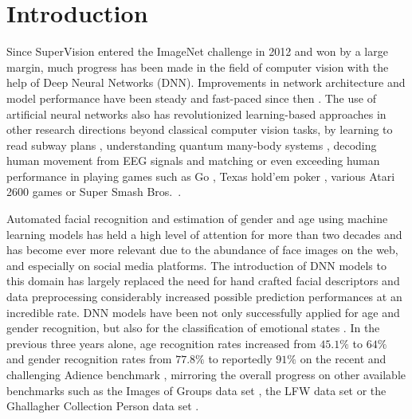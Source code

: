 \documentclass[10pt,twocolumn,letterpaper]{article}
\begin{document}
\section{Introduction}
\label{sec:introduction}

Since SuperVision \cite{krizhevsky2012imagenet} entered the ImageNet \cite{russakovsky2015imagenet} challenge in 2012 and won by a large margin, much progress has been made in the field of computer vision with the help of Deep Neural Networks (DNN). Improvements in network architecture and model performance have been steady and fast-paced since then \cite{zeiler2014visualizing,simonyan2014very,szegedy2015going,szegedy2016inception}. The use of artificial neural networks also has revolutionized learning-based approaches in other research directions beyond classical computer vision tasks, \eg by learning to read subway plans \cite{graves2016hybrid}, understanding quantum many-body systems \cite{schutt2017quantum}, decoding human movement from EEG signals \cite{StuJNM16,schirrmeister2017deep} and matching or even exceeding human performance in playing games such as Go \cite{silver2016mastering}, Texas hold'em poker \cite{moravvcik2017deepstack}, various Atari 2600 games \cite{mnih2015human} or Super Smash Bros.~\cite{firoiu2017beating}.

Automated facial recognition and estimation of gender and age using machine learning models has held a high level of attention for more than two decades \cite{kwon1994age,o1997sex,baluja2007boosting,guo2009study,gao2009face} and has become ever more relevant due to the abundance of face images on the web, and especially on social media platforms.
The introduction of DNN models to this domain has largely replaced the need for hand crafted facial descriptors and data preprocessing considerably increased possible prediction performances at an incredible rate. DNN models have been not only successfully applied for age and gender recognition, but also for the classification of emotional states \cite{ArbGCPR16}.
In the previous three years alone, age recognition rates increased from $45.1\%$ \cite{eidinger2014age} to $64\%$ \cite{rothe2016deep} and gender recognition rates from $77.8\%$ to reportedly $91\%$ \cite{dehghan2017dager} on the recent and challenging Adience benchmark \cite{eidinger2014age}, mirroring the overall progress on other available benchmarks such as the Images of Groups data set \cite{gallagher_cvpr_09_groups}, the LFW data set \cite{LFWTech} or the Ghallagher Collection Person data set \cite{gallagher_cvpr_08_clothing}.
\end{document}
